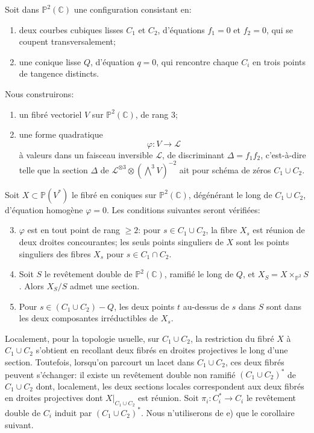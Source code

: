 \documentclass[10pt]{article}
\newcommand{\C}{\mathbb C}
\newcommand{\Pj}{\mathbb P}
\begin{document}
Soit dans \(\Pj^2(\C)\) une configuration consistant en:
\begin{enumerate}[label=\alph*)]
\item deux courbes cubiques lisses \(C_1\) et \(C_2\), d'équations \(f_1=0\) et \(f_2=0\), qui se coupent transversalement;
\item une conique lisse \(Q\), d'équation \(q=0\), qui rencontre chaque \(C_i\) en trois points de tangence distincts.
\end{enumerate}
Nous construirons:
\begin{enumerate}[label=\alph*)]
\item un fibré vectoriel \(V\) sur \(\Pj^2(\C)\), de rang \(3\);
\item une forme quadratique
\[
\varphi:V\longrightarrow \mathcal L
\]
à valeurs dans un faisceau inversible \(\mathcal L\), de discriminant \(\Delta=f_1f_2\), c'est-à-dire telle que la section \(\Delta\) de \(\mathcal L^{\otimes3}\otimes(\bigwedge^3V)^{-2}\) ait pour schéma de zéros \(C_1\cup C_2\).
\end{enumerate}
Soit \(X\subset \Pj(V^*)\) le fibré en coniques sur \(\Pj^2(\C)\), dégénérant le long de \(C_1\cup C_2\), d'équation homogène \(\varphi=0\). Les conditions suivantes seront vérifiées:
\begin{enumerate}[label=\alph*)]
\setcounter{enumi}{2}
\item \(\varphi\) est en tout point de rang \(\ge2\): pour \(s\in C_1\cup C_2\), la fibre \(X_s\) est réunion de deux droites concourantes; les seuls points singuliers de \(X\) sont les points singuliers des fibres \(X_s\) pour \(s\in C_1\cap C_2\).
\item Soit \(S\) le revêtement double de \(\Pj^2(\C)\), ramifié le long de \(Q\), et \(X_S=X\times_{\Pj^2}S\). Alors \(X_S/S\) admet une section.
\item Pour \(s\in(C_1\cup C_2)-Q\), les deux points \(t\) au-dessus de \(s\) dans \(S\) sont dans les deux composantes irréductibles de \(X_s\).
\end{enumerate}
Localement, pour la topologie usuelle, sur \(C_1\cup C_2\), la restriction du fibré \(X\) à \(C_1\cup C_2\) s'obtient en recollant deux fibrés en droites projectives le long d'une section. Toutefois, lorsqu'on parcourt un lacet dans \(C_1\cup C_2\), ces deux fibrés peuvent s'échanger: il existe un revêtement double non ramifié \((C_1\cup C_2)^*\) de \(C_1\cup C_2\) dont, localement, les deux sections locales correspondent aux deux fibrés en droites projectives dont \(X|_{C_1\cup C_2}\) est réunion. Soit \(\pi_i:C_i^*\to C_i\) le revêtement double de \(C_i\) induit par \((C_1\cup C_2)^*\). Nous n'utiliserons de e) que le corollaire suivant.
\end{document}
